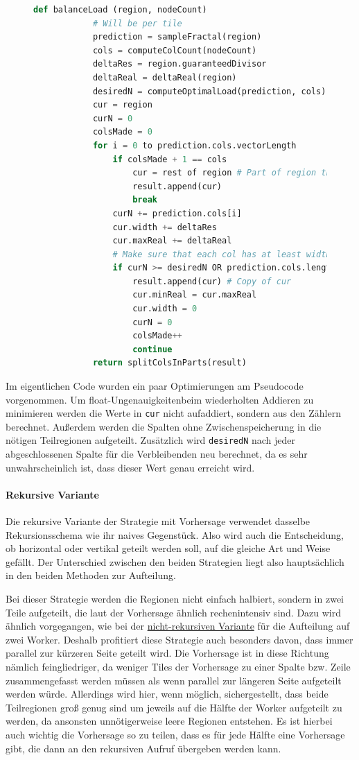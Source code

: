 \begin{figure}[!h]
	\begin{lstlisting}[language=python, caption={Aufteilung in Spalten im Pseudocode}, label={src:prediction_pseudo}]
		def balanceLoad (region, nodeCount)
			# Will be per tile
			prediction = sampleFractal(region)
			cols = computeColCount(nodeCount)
			deltaRes = region.guaranteedDivisor
			deltaReal = deltaReal(region)
			desiredN = computeOptimalLoad(prediction, cols)
			cur = region
			curN = 0
			colsMade = 0
			for i = 0 to prediction.cols.vectorLength
				if colsMade + 1 == cols
					cur = rest of region # Part of region thats not already assigned to a col
					result.append(cur)
					break
				curN += prediction.cols[i]
				cur.width += deltaRes
				cur.maxReal += deltaReal
				# Make sure that each col has at least width = deltaRes
				if curN >= desiredN OR prediction.cols.length - i - 1 < cols
					result.append(cur) # Copy of cur
					cur.minReal = cur.maxReal
					cur.width = 0
					curN = 0
					colsMade++
					continue
			return splitColsInParts(result)
	\end{lstlisting}
\end{figure}

Im eigentlichen Code wurden ein paar Optimierungen am Pseudocode vorgenommen.
Um float-Ungenauigkeitenbeim wiederholten Addieren zu minimieren werden die Werte in \verb|cur| nicht aufaddiert, sondern aus den Zählern berechnet.
Außerdem werden die Spalten ohne Zwischenspeicherung in die nötigen Teilregionen aufgeteilt.
Zusätzlich wird \verb|desiredN| nach jeder abgeschlossenen Spalte für die Verbleibenden neu berechnet, da es sehr unwahrscheinlich ist, dass dieser Wert genau erreicht wird.

\paragraph*{Rekursive Variante}
Die rekursive Variante der Strategie mit Vorhersage verwendet dasselbe Rekursionsschema wie ihr naives Gegenstück.
Also wird auch die Entscheidung, ob horizontal oder vertikal geteilt werden soll, auf die gleiche Art und Weise gefällt.
Der Unterschied zwischen den beiden Strategien liegt also hauptsächlich in den beiden Methoden zur Aufteilung.

Bei dieser Strategie werden die Regionen nicht einfach halbiert, sondern in zwei Teile aufgeteilt, die laut der Vorhersage ähnlich rechenintensiv sind.
Dazu wird ähnlich vorgegangen, wie bei der \hyperref[lastbalancierung_vorhersage]{nicht-rekursiven Variante} für die Aufteilung auf zwei Worker.
Deshalb profitiert diese Strategie auch besonders davon, dass immer parallel zur kürzeren Seite geteilt wird.
Die Vorhersage ist in diese Richtung nämlich feingliedriger, da weniger Tiles der Vorhersage zu einer Spalte bzw. Zeile zusammengefasst werden müssen als wenn parallel zur längeren Seite aufgeteilt werden würde.
Allerdings wird hier, wenn möglich, sichergestellt, dass beide Teilregionen groß genug sind um jeweils auf die Hälfte der Worker aufgeteilt zu werden, da ansonsten unnötigerweise leere Regionen entstehen.
Es ist hierbei auch wichtig die Vorhersage so zu teilen, dass es für jede Hälfte eine Vorhersage gibt, die dann an den rekursiven Aufruf übergeben werden kann.

